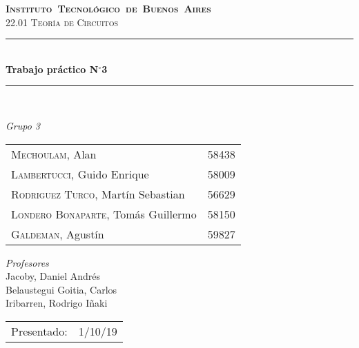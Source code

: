 \begin{titlepage}
\newcommand{\HRule}{\rule{\linewidth}{0.5mm}}
\center
\mbox{\textsc{\LARGE \bfseries {Instituto Tecnológico de Buenos Aires}}}\\[1.5cm]
\textsc{\Large 22.01 Teoría de Circuitos}\\[0.5cm]


\HRule \\[0.6cm]
{ \Huge \bfseries Trabajo práctico N$^{\circ}$3}\\[0.4cm] 
\HRule \\[1.5cm]


{\large

\emph{Grupo 3}\\
\vspace{3px}

\begin{tabular}{lr} 	
\textsc{Mechoulam}, Alan  &  58438\\
\textsc{Lambertucci}, Guido Enrique  & 58009 \\
\textsc{Rodriguez Turco}, Martín Sebastian  & 56629 \\
\textsc{Londero Bonaparte}, Tomás Guillermo  & 58150 \\
\textsc{Galdeman}, Agustín & 59827\\
\end{tabular}

\vspace{20px}

\emph{Profesores}\\
Jacoby, Daniel Andrés\\
Belaustegui Goitia, Carlos\\
Iribarren, Rodrigo Iñaki\\
\vspace{3px}

\vspace{100px}

\begin{tabular}{ll}

Presentado: & 1/10/19\\

\end{tabular}

}

\vfill

\end{titlepage}
